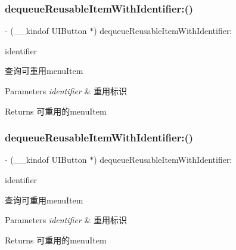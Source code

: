 \subsubsection{\texorpdfstring{dequeue\+Reusable\+Item\+With\+Identifier\+:()}{dequeueReusableItemWithIdentifier:()}\hspace{0.1cm}{\footnotesize\ttfamily [2/3]}}
{\footnotesize\ttfamily -\/ (\+\_\+\+\_\+kindof U\+I\+Button $\ast$) dequeue\+Reusable\+Item\+With\+Identifier\+: \begin{DoxyParamCaption}\item[{(N\+S\+String $\ast$)}]{identifier }\end{DoxyParamCaption}}

查询可重用menu\+Item


\begin{DoxyParams}{Parameters}
{\em identifier} & 重用标识\\
\hline
\end{DoxyParams}
\begin{DoxyReturn}{Returns}
可重用的menu\+Item 
\end{DoxyReturn}
\mbox{\label{interface_v_t_magic_view_a53dd4f1868c19fcc9a8fcce1cefb41f8}} 
\subsubsection{\texorpdfstring{dequeue\+Reusable\+Item\+With\+Identifier\+:()}{dequeueReusableItemWithIdentifier:()}\hspace{0.1cm}{\footnotesize\ttfamily [3/3]}}
{\footnotesize\ttfamily -\/ (\+\_\+\+\_\+kindof U\+I\+Button $\ast$) dequeue\+Reusable\+Item\+With\+Identifier\+: \begin{DoxyParamCaption}\item[{(N\+S\+String $\ast$)}]{identifier }\end{DoxyParamCaption}}

查询可重用menu\+Item


\begin{DoxyParams}{Parameters}
{\em identifier} & 重用标识\\
\hline
\end{DoxyParams}
\begin{DoxyReturn}{Returns}
可重用的menu\+Item 
\end{DoxyReturn}
\mbox{\label{interface_v_t_magic_view_a5bb11ea7692fa50a93f57c6d25a69158}} 
